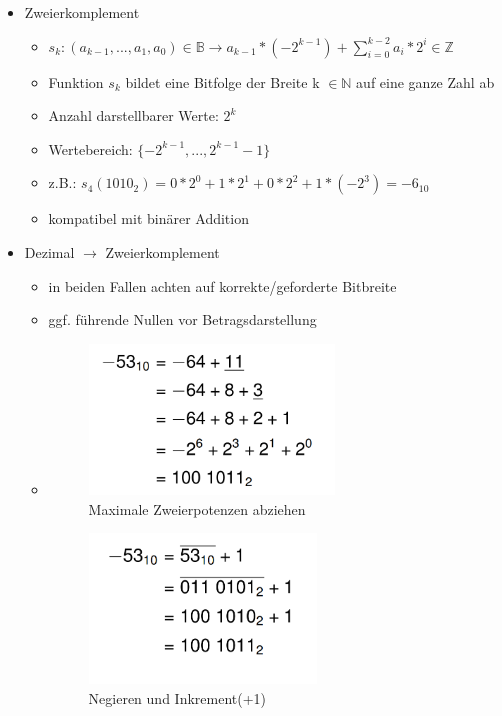 \documentclass[11pt,a4paper]{article}
\begin{document}
\begin{itemize}
\begin{itemize}
	\item Zweierkomplement
		\begin{itemize}
		\item $s_k:(a_{k-1},...,a_1,a_0) \in \mathbb{B} \rightarrow a_{k-1} * (-2^{k-1}) + \sum^{k-2}_{i=0} a_i * 2^i \in \mathbb{Z}$
		\item Funktion $s_k$ bildet eine Bitfolge der Breite k $\in \mathbb{N}$ auf eine ganze Zahl ab
		\item Anzahl darstellbarer Werte: $2^k$
		\item Wertebereich: $\{-2^{k-1},...,2^{k-1}-1\}$
		\item z.B.: $s_4(1010_2) = 0*2^0+1*2^1+0*2^2+1*(-2^3)=-6_{10}$
		\item kompatibel mit binärer Addition
		\end{itemize}			
	
	\item Dezimal $\rightarrow$ Zweierkomplement
		\begin{itemize}
		\item in beiden Fallen achten auf korrekte/geforderte Bitbreite 
		\item ggf. führende Nullen vor Betragsdarstellung
		\item[]
			\begin{minipage}{0.4\textwidth}
				\begin{figure}[H]
				\includegraphics[height=4cm]{dtoz1}
				\caption{Maximale Zweierpotenzen abziehen}
				\end{figure}
			\end{minipage}
			\begin{minipage}[t]{0.45\textwidth}
				\begin{figure}[H]
				\vspace{-3cm}
				\includegraphics[height=4cm]{dtoz2}
				\caption{Negieren und Inkrement(+1)}
				\end{figure}
			\end{minipage}
		

\end{itemize}
\end{itemize}
\end{itemize}
\end{document}
